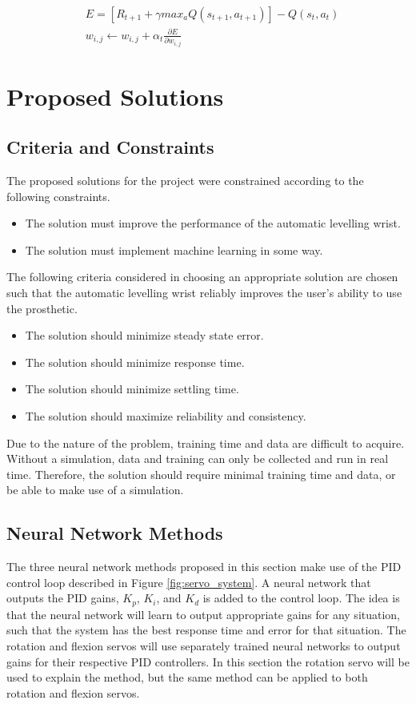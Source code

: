 \documentclass[letterpaper,12pt]{article}
\newcommand{\di}{\partial}
\begin{document}
\begin{equation}
\begin{split}
	\label{eq:func_approx}
	& E = [R_{t+1} + \gamma max_a Q(s_{t+1}, a_{t+1})] - Q(s_t,a_t) \\
	& w_{i,j} \leftarrow w_{i,j} + \alpha_t \frac{\di E}{\di w_{i,j}}
\end{split}
\end{equation}


\section{Proposed Solutions}
\subsection{Criteria and Constraints}

The proposed solutions for the project were constrained according to the following constraints.
\begin{itemize}
		\item The solution must improve the performance of the automatic levelling wrist.
    \item The solution must implement machine learning in some way.

\end{itemize}

The following criteria considered in choosing an appropriate solution are chosen such that the automatic levelling wrist reliably improves the user's ability to use the prosthetic.
\begin{itemize}
    \item The solution should minimize steady state error.
		\item The solution should minimize response time.
		\item The solution should minimize settling time.
		\item The solution should maximize reliability and consistency.
\end{itemize}
Due to the nature of the problem, training time and data are difficult to acquire. Without a simulation, data and training can only be collected and run in real time. Therefore, the solution should require minimal training time and data, or be able to make use of a simulation.

\subsection{Neural Network Methods}
The three neural network methods proposed in this section make use of the PID control loop described in Figure \ref{fig:servo_system}. A neural network that outputs the PID gains, $K_p$, $K_i$, and $K_d$ is added to the control loop. The idea is that the neural network will learn to output appropriate gains for any situation, such that the system has the best response time and error for that situation. The rotation and flexion servos will use separately trained neural networks to output gains for their respective PID controllers. In this section the rotation servo will be used to explain the method, but the same method can be applied to both rotation and flexion servos.
\end{document}
